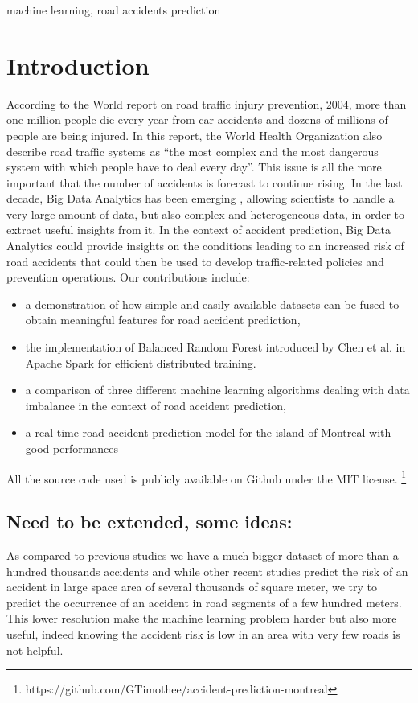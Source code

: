 \documentclass[conference]{IEEEtran}
\begin{document}
\begin{IEEEkeywords}
machine learning, road accidents prediction
\end{IEEEkeywords}

\section{Introduction}
According to the World report on road traffic injury prevention, 2004, more than one million people die every year from car accidents and dozens of millions of people are being injured\cite{Peden2004}.
In this report, the World Health Organization also describe road traffic systems as “the most complex and the most dangerous system with which people have to deal every day”.
This issue is all the more important that the number of accidents is forecast to continue rising.
In the last decade, Big Data Analytics has been emerging \cite{Gandomi2015}, allowing scientists to handle a very large amount of data, but also complex and heterogeneous data, in order to extract useful insights from it.
In the context of accident prediction, Big Data Analytics could provide insights on the conditions leading to an increased risk of road accidents that could then be used to develop traffic-related policies and prevention operations.
Our contributions include: 
\begin{itemize}
\item a demonstration of how simple and easily available datasets can be fused to obtain meaningful features for road accident prediction,
\item the implementation of Balanced Random Forest introduced by Chen et al.\cite{Chen2004} in Apache Spark for efficient distributed training.
\item a comparison of three different machine learning algorithms dealing with data imbalance in the context of road accident prediction,
\item a real-time road accident prediction model for the island of Montreal with good performances
\end{itemize}
All the source code used is publicly available on Github under the MIT license. \footnote{https://github.com/GTimothee/accident-prediction-montreal}

\subsection{Need to be extended, some ideas:}

  As compared to previous studies we have a much bigger dataset of more than a hundred thousands accidents and while other recent studies predict the risk  of an accident in large space area of several thousands of square meter, we try to predict the occurrence of an accident in road segments of a few hundred meters. This lower resolution make the machine learning problem harder but also more useful, indeed knowing the accident risk is low in an area with very few roads is not helpful. 
\end{document}
